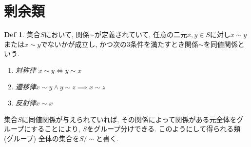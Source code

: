 \documentclass[dvipdfmx]{jsarticle}
\theoremstyle{definition}
\newtheorem{definition}{Def}
\numberwithin{equation}{section}
\numberwithin{props}{section}
\numberwithin{definition}{section}
\numberwithin{note}{section}
\begin{document}
\section{剰余類}
\begin{definition}
     集合$S$において, 関係$\sim$が定義されていて, 任意の二元$x,y\in S$に対し$x\sim y$または$x\sim y$でないかが成立し, かつ次の3条件を満たすとき関係$\sim$を同値関係という.
     \begin{enumerate}
          \item \emph{対称律} $x\sim y\iff y\sim x$
          \item \emph{遷移律}$x\sim y \land y\sim z \implies x\sim z$
          \item \emph{反射律}$x\sim x$
     \end{enumerate}
\end{definition}
集合$S$に同値関係が与えられていれば, その関係によって関係がある元全体をグループにすることにより, $S$をグループ分けできる. このようにして得られる類 (グループ) 全体の集合を$S/\sim$と書く.
\end{document}
